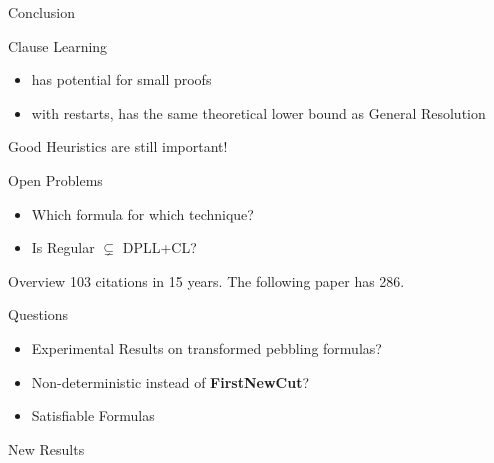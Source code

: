 \documentclass[page number]{beamer}
\begin{document}
\begin{frame}{Conclusion}
  \begin{exampleblock}{Clause Learning}
    \begin{itemize}
    \item has potential for small proofs
    \item with restarts, has the same theoretical lower bound as General Resolution
    \end{itemize}
  \end{exampleblock}
  \vfill
  \begin{alertblock}{Good Heuristics are still important!}
  \end{alertblock}
  \vfill
  \begin{block}{Open Problems}
    \begin{itemize}
    \item Which formula for which technique?
    \item Is Regular $\varsubsetneq$ DPLL+CL?
    \end{itemize}
  \end{block}
\end{frame}

\begin{frame}{Overview}
  103 citations in 15 years. The following paper has 286.
  \vfill
  \begin{alertblock}{Questions}
    \begin{itemize}
    \item Experimental Results on transformed pebbling formulas?
    \item Non-deterministic instead of \textbf{FirstNewCut}?
    \item Satisfiable Formulas
    \end{itemize}
  \end{alertblock}
\end{frame}

\begin{frame}{New Results}
  \begin{center}
  \end{center}
\end{frame}
\end{document}

